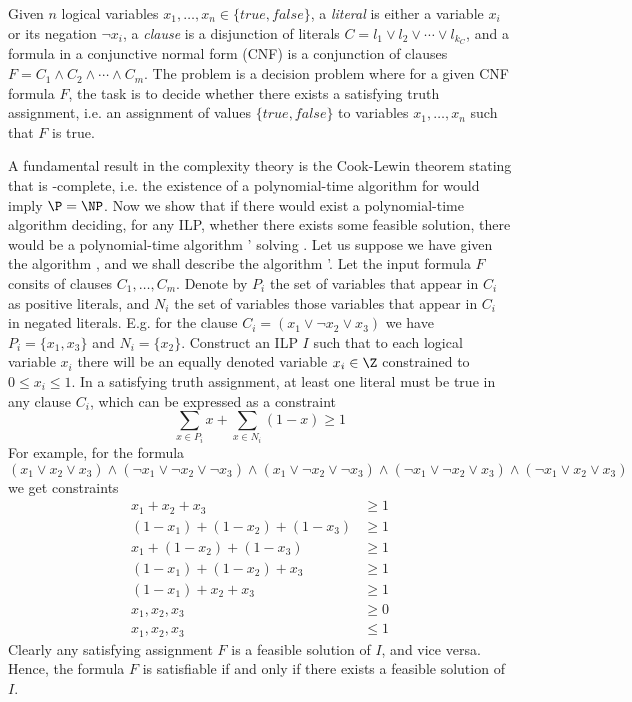 \begin{framed}
  \begin{dfn}
    \label{dfn:sat}
    Given $n$ logical variables $x_1,\ldots,x_n\in\{true,false\}$, a {\em literal}
    is either a variable $x_i$ or its negation $\neg{x_i}$, a {\em clause} is 
    a disjunction of literals $C=l_1\vee l_2\vee\cdots\vee l_{k_C}$, and a formula
    in a conjunctive normal form (CNF) is a conjunction of clauses
    $F=C_1\wedge C_2\wedge\cdots\wedge C_m$. The problem \sat is a decision 
    problem where for a given CNF formula $F$, the task is to decide whether there exists a
    satisfying truth assignment, i.e. an assignment of values $\{true, false\}$ to variables
    $x_1,\ldots,x_n$ such that $F$ is true.
  \end{dfn}
\end{framed}

\noindent 
A fundamental result in the complexity theory is the Cook-Lewin theorem stating that \sat is \NP-complete,
i.e. the existence of a polynomial-time algorithm for \sat would imply $\P=\NP$.
Now we show that if there would exist a polynomial-time algorithm \algA deciding, for any ILP, whether there 
exists some feasible solution, there would be a polynomial-time algorithm \algA' solving \sat. Let us suppose we
have given the algorithm \algA, and we shall describe the algorithm \algA'. Let the input formula $F$ consits of 
clauses   $C_1,\ldots,C_m$. Denote by  $P_i$ the set of variables that appear in $C_i$ as positive literals, and
$N_i$ the set of variables those variables that appear in $C_i$ in negated literals. E.g. for the clause 
$C_i=(x_1\vee\neg{x_2}\vee x_3)$ we have $P_i=\{x_1,x_3\}$ and
$N_i=\{x_2\}$.  Construct an ILP $I$ such that to each logical variable $x_i$ there will be an equally denoted
variable $x_i\in\Z$ constrained to $0\le x_i\le1$. 
In a satisfying truth assignment, at least one literal must be true in any clause $C_i$, which can be expressed
as a constraint
$$\sum_{x\in P_i}x + \sum_{x\in N_i}(1-x) \ge 1$$
For example, for the formula
$$(x_1\vee x_2\vee x_3)\wedge(\neg{x_1}\vee\neg{x_2}\vee\neg{x_3})\wedge(x_1\vee\neg{x_2}\vee\neg{x_3})\wedge(\neg{x_1}\vee\neg{x_2}\vee x_3)\wedge(\neg{x_1}\vee x_2\vee x_3)$$
we get constraints
\begin{align*}
  x_1+x_2+x_3&\ge1\\
  (1-x_1)+(1-x_2)+(1-x_3)&\ge1\\
  x_1+(1-x_2)+(1-x_3)&\ge1\\
  (1-x_1)+(1-x_2)+x_3&\ge1\\
  (1-x_1)+x_2+x_3&\ge1\\
  x_1,x_2,x_3&\ge0\\
  x_1,x_2,x_3&\le1
\end{align*}
Clearly any satisfying assignment $F$ is a feasible solution of $I$, and vice versa. Hence, the formula $F$ is 
satisfiable if and only if there exists a feasible solution of $I$.


